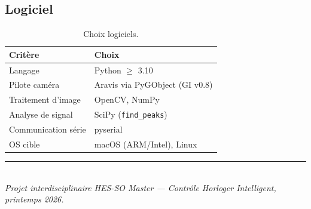 \documentclass[a4paper,11pt]{article}
\newcommand{\code}[1]{\colorbox{codebg}{\texttt{#1}}}
\begin{document}
\subsection{Logiciel}

\begin{table}[h]
    \centering
    \begin{tabular}{l l}
        \toprule
        \textbf{Critère} & \textbf{Choix} \\
        \midrule
        Langage              & Python $\geq$ 3.10 \\
        Pilote caméra        & Aravis via PyGObject (GI v0.8) \\
        Traitement d'image   & OpenCV, NumPy \\
        Analyse de signal    & SciPy (\code{find\_peaks}) \\
        Communication série  & pyserial \\
        OS cible             & macOS (ARM/Intel), Linux \\
        \bottomrule
    \end{tabular}
    \caption{Choix logiciels.}
    \label{tab:logiciel}
\end{table}

\vfill
\begin{center}
    \rule{0.5\textwidth}{0.4pt}\\[0.5em]
    \textit{Projet interdisciplinaire HES-SO Master --- Contrôle Horloger Intelligent, printemps 2026.}
\end{center}
\end{document}
